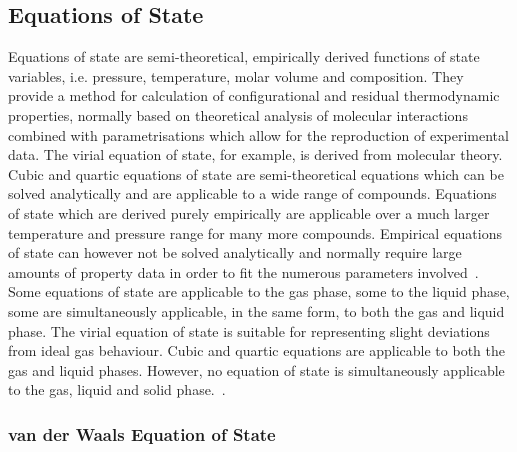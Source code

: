 \subsection{Equations of State}\label{EOSSection}

Equations of state are semi-theoretical, empirically derived functions of state variables, i.e. pressure, temperature, molar volume and composition. They provide a method for calculation of configurational and residual thermodynamic properties, normally based on theoretical analysis of molecular interactions combined with parametrisations which allow for the reproduction of experimental data. The virial equation of state, for example, is derived from molecular theory. Cubic and quartic equations of state are semi-theoretical equations which can be solved analytically and are applicable to a wide range of compounds. Equations of state which are derived purely empirically are applicable over a much larger temperature and pressure range for many more compounds. Empirical equations of state can however not be solved analytically and normally require large amounts of property data in order to fit the numerous parameters involved~\cite{ThermophysicalProperties, GasLiquidProperties}.\\

Some equations of state are applicable to the gas phase, some to the liquid phase, some are simultaneously applicable, in the same form, to both the gas and liquid phase.  The virial equation of state is suitable for representing slight deviations from ideal gas behaviour. Cubic and quartic equations are applicable to both the gas and liquid phases. However, no equation of state is simultaneously applicable to the gas, liquid and solid phase.~\cite{ThermophysicalProperties, GasLiquidProperties}.\



\subsubsection{van der Waals Equation of State}\

